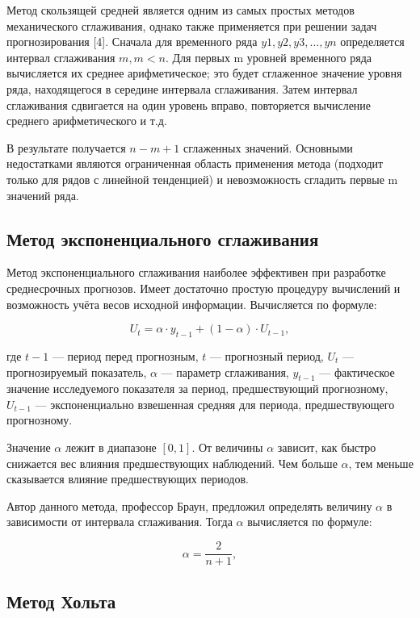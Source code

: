 Метод скользящей средней является одним из самых простых методов механического сглаживания, однако 
также применяется при решении задач прогнозирования [4]. Сначала для временного ряда $y1, y2, y3,\ldots,yn$ 
определяется интервал сглаживания $m, m<n$. Для первых m уровней временного ряда вычисляется их 
среднее арифметическое; это будет сглаженное значение уровня ряда, находящегося в середине интервала 
сглаживания. Затем интервал сглаживания сдвигается на один уровень вправо, повторяется вычисление 
среднего арифметического и т.д. 

В результате получается $n - m + 1$ сглаженных значений. Основными недостатками являются ограниченная
область применения метода (подходит только для рядов с линейной тенденцией) и невозможность сгладить 
первые m значений ряда.

\subsection{Метод экспоненциального сглаживания}

Метод экспоненциального сглаживания наиболее эффективен при разработке среднесрочных прогнозов. 
Имеет достаточно простую процедуру вычислений и возможность учёта весов исходной информации. 
Вычисляется по формуле:

\begin{equation}
	U_{t} = \alpha \cdot y_{t-1} + (1 - \alpha) \cdot U_{t-1},
\end{equation}

где $t-1$ — период перед прогнозным, $t$ — прогнозный период, $U_{t}$ — прогнозируемый показатель,
$\alpha$ — параметр сглаживания, $y_{t-1}$ — фактическое значение исследуемого показателя за период, 
предшествующий прогнозному, $U_{t-1}$ — экспоненциально взвешенная средняя для периода, 
предшествующего прогнозному.

Значение $\alpha$ лежит в диапазоне $[0, 1]$. От величины $\alpha$ зависит, как быстро снижается 
вес влияния предшествующих наблюдений. Чем больше $\alpha$, тем меньше сказывается влияние 
предшествующих периодов.

Автор данного метода, профессор Браун, предложил определять величину $\alpha$ в зависимости от интервала
сглаживания. Тогда $\alpha$ вычисляется по формуле:

\begin{equation}
	\alpha = \frac{2}{n + 1},
\end{equation}

\subsection{Метод Хольта}

